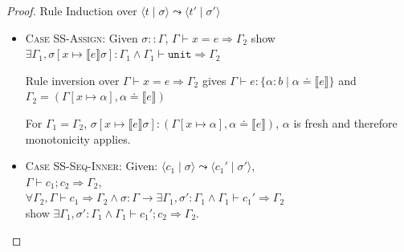 \documentclass{book}
\newcommand{\code}[1]{\texttt{#1}}
\newcommand{\tuple}[2]{\langle #1 \mid #2 \rangle}
\newcommand{\bbracket}[1]{\llbracket #1 \rrbracket}
\theoremstyle{definition}
\begin{document}
\begin{proof} Rule Induction over $\tuple{t}{\sigma} \leadsto \tuple{t'}{\sigma'}$
\begin{itemize}
  \item \textsc{Case SS-Assign}:
    Given $\sigma :: \Gamma$, $\Gamma \vdash x = e \Rightarrow \Gamma_2$
    show $\exists \Gamma_1, \sigma[ x \mapsto \llbracket e \rrbracket \sigma] : \Gamma_1 \wedge \Gamma_1 \vdash \code{unit} \Rightarrow \Gamma_2 $

    Rule inversion over $\Gamma \vdash x = e \Rightarrow \Gamma_2$ gives $\Gamma \vdash e: \{ \alpha : b \mid \alpha \doteq \llbracket e \rrbracket \}$ and $\Gamma_2 = (\Gamma[x \mapsto \alpha], \alpha \doteq \llbracket e \rrbracket)$

    For $\Gamma_1 = \Gamma_2$, $\sigma[x \mapsto \bbracket{e}\sigma ] : (\Gamma[x \mapsto \alpha], \alpha \doteq \llbracket e \rrbracket)$, $\alpha$ is fresh and therefore monotonicity applies.
    




  \item \textsc{Case SS-Seq-Inner}:
    Given: $\tuple{c_1}{\sigma} \leadsto \tuple{c_1'}{\sigma'}$, \\
     $\Gamma \vdash c_1 ; c_2 \Rightarrow \Gamma_2$, \\
     $\forall \Gamma_2, \Gamma \vdash c_1 \Rightarrow \Gamma_2 \wedge \sigma : \Gamma \to \exists \Gamma_1, \sigma' : \Gamma_1 \wedge \Gamma_1 \vdash c_1' \Rightarrow \Gamma_2$ \\
    show $\exists \Gamma_1, \sigma' : \Gamma_1 \wedge \Gamma_1 \vdash c_1' ; c_2  \Rightarrow \Gamma_2$.


\end{itemize}
\end{proof}
\end{document}
